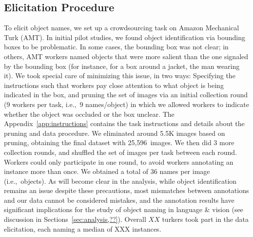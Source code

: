 \subsection{Elicitation Procedure}
\label{ssec:elicitation}
To elicit object names, we set up a crowdsourcing task on Amazon Mechanical Turk (AMT).
In initial pilot studies, we found object identification via bounding boxes to be problematic.
In some cases, the bounding box was not clear; in others, AMT workers named objects that were more salient than the one signaled by the bounding box (for instance, for a box around a jacket, the man wearing it).
We took special care of minimizing this issue, in two ways: Specifying the instructions such that workers pay close attention to what object is being indicated in the box, and pruning the set of images via an initial collection round (9 workers per task, i.e.,\ 9 names/object) in which we allowed workers to indicate whether the object was occluded or the box unclear.
The Appendix~\ref{app:instructions} contains the task instructions and details about the pruning and data procedure.
We eliminated around 5.5K images based on pruning, obtaining the final dataset with 25,596\ images.
We then did 3 more collection rounds, and shuffled the set of images per task between each round. 
Workers could only participate in one round, to avoid workers annotating an instance more than once. 
We obtained a total of 36 names per image (i.e.,\ objects).
As will become clear in the analysis, while object identification remains an issue despite these precautions, most mismatches between \vg annotations  and our data cannot be considered mistakes, and the annotation results have significant implications for the study of object naming in language \& vision (see discussion in Sections~\ref{sec:analysis,??}).
Overall $XX$ turkers took part in the data elicitation, each naming a median of XXX instances. 
